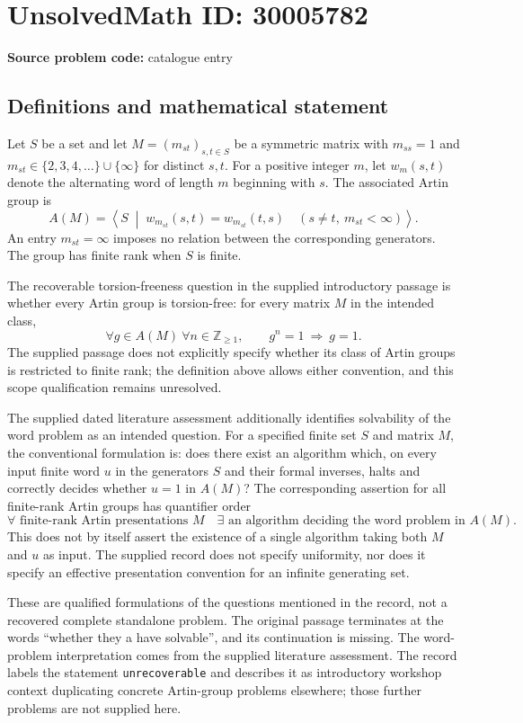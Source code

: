 \documentclass[11pt]{article}
\newcommand{\Z}{\mathbb{Z}}
\begin{document}
\section*{UnsolvedMath ID: 30005782}
\textbf{Source problem code:} catalogue entry
\subsection{Definitions and mathematical statement}
Let \(S\) be a set and let \(M=(m_{st})_{s,t\in S}\) be a symmetric matrix with \(m_{ss}=1\) and \(m_{st}\in\{2,3,4,\ldots\}\cup\{\infty\}\) for distinct \(s,t\). For a positive integer \(m\), let \(w_m(s,t)\) denote the alternating word of length \(m\) beginning with \(s\). The associated Artin group is
\[
A(M)=\left\langle S\;\middle|\;w_{m_{st}}(s,t)=w_{m_{st}}(t,s)\quad(s\ne t,\ m_{st}<\infty)\right\rangle.
\]
An entry \(m_{st}=\infty\) imposes no relation between the corresponding generators. The group has finite rank when \(S\) is finite.

The recoverable torsion-freeness question in the supplied introductory passage is whether every Artin group is torsion-free: for every matrix \(M\) in the intended class,
\[
\forall g\in A(M)\ \forall n\in\Z_{\geq 1},\qquad g^n=1\ \Longrightarrow\ g=1.
\]
The supplied passage does not explicitly specify whether its class of Artin groups is restricted to finite rank; the definition above allows either convention, and this scope qualification remains unresolved.

The supplied dated literature assessment additionally identifies solvability of the word problem as an intended question. For a specified finite set \(S\) and matrix \(M\), the conventional formulation is: does there exist an algorithm which, on every input finite word \(u\) in the generators \(S\) and their formal inverses, halts and correctly decides whether \(u=1\) in \(A(M)\)? The corresponding assertion for all finite-rank Artin groups has quantifier order
\[
\forall\text{ finite-rank Artin presentations }M\quad
\exists\text{ an algorithm deciding the word problem in }A(M).
\]
This does not by itself assert the existence of a single algorithm taking both \(M\) and \(u\) as input. The supplied record does not specify uniformity, nor does it specify an effective presentation convention for an infinite generating set.

These are qualified formulations of the questions mentioned in the record, not a recovered complete standalone problem. The original passage terminates at the words ``whether they a have solvable'', and its continuation is missing. The word-problem interpretation comes from the supplied literature assessment. The record labels the statement \texttt{unrecoverable} and describes it as introductory workshop context duplicating concrete Artin-group problems elsewhere; those further problems are not supplied here.
\end{document}
